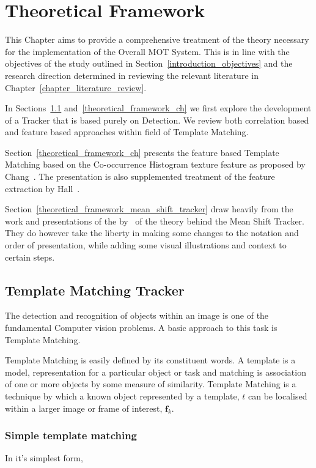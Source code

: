 \chapter{Theoretical Framework}\label{chapter_theoretical_framework}

This Chapter aims to provide a comprehensive treatment of the theory necessary
for the implementation of the Overall MOT System. This is in line with the
objectives of the study outlined in Section~\ref{introduction_objectives} and
the research direction determined in reviewing the relevant literature in
Chapter~\ref{chapter_literature_review}.

In Sections~\ref{theoretical_framework_tm} and~\ref{theoretical_framework_ch} we first
explore the development of a Tracker that is based purely on Detection. We
review both correlation based and feature based approaches within field of Template Matching.

Section~\ref{theoretical_framework_ch} presents the feature based Template
Matching based on the Co-occurrence Histogram texture feature as proposed by
Chang~\cite{Chang1999}. The presentation is also supplemented treatment of the
feature extraction by Hall~\cite{Hall-beyer2018}.

Section~\ref{theoretical_framework_mean_shift_tracker} draw heavily from the
work and presentations of the by~\cite{Comaniciu2002, Comaniciu2003,
Shah2011} of the theory behind the Mean Shift Tracker. They do however take the
liberty in making some changes to the notation and order of presentation, while
adding some visual illustrations and
context to certain steps. 


\section{Template Matching Tracker}\label{theoretical_framework_tm}
The detection and recognition of objects within an image is one of the
fundamental Computer vision problems. A basic approach to this task is Template
Matching.

Template Matching is easily defined by its constituent words. A template is a
model, representation for a particular object or task and matching is
association of one or more objects by some measure of similarity. Template
Matching is a technique by which a known object represented by a template, $t$
can be localised within a larger image or frame of interest, $\mathbf{f}_k$.

\subsection{Simple template matching}\label{theoretical_framework_simple_tm}
In it's simplest form, 

